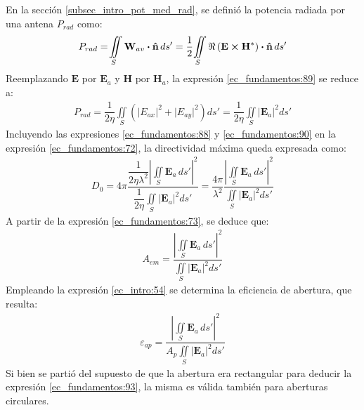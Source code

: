 En la sección \ref{subsec_intro_pot_med_rad}, se definió la potencia radiada por una antena $P_{rad}$ como:
\begin{align}
P_{rad} = \!\iint\limits_S\mathbf{W}_{av}\boldsymbol{\cdot}\bm{\mathbf{\hat{n}}}\,ds' = \dfrac{1}{2}\!\iint\limits_S\Re\left(\mathbf{E}\boldsymbol{\times}\mathbf{H}^*\right)\boldsymbol{\cdot}\bm{\mathbf{\hat{n}}}\,ds'
\label{ec_fundamentos:89}
\end{align}
Reemplazando $\mathbf{E}$ por $\mathbf{E}_a$ y $\mathbf{H}$ por $\mathbf{H}_a$, la expresión \eqref{ec_fundamentos:89} se reduce a:
\begin{align}
P_{rad} = \dfrac{1}{2\eta}\!\iint\limits_S\left(\lvert E_{ax}\rvert^2 + \lvert E_{ay}\rvert^2\right)ds' = \dfrac{1}{2\eta}\!\iint\limits_S\lvert \mathbf{E}_a\rvert^2 ds'
\label{ec_fundamentos:90}
\end{align}
Incluyendo las expresiones \eqref{ec_fundamentos:88} y \eqref{ec_fundamentos:90} en la expresión \eqref{ec_fundamentos:72}, la directividad máxima queda expresada como:
\begin{align}
D_0  = 4\pi\dfrac{\dfrac{1}{2\eta\lambda^2}\left|\displaystyle\iint\limits_S\mathbf{E}_a\, ds'\right|^2}{\dfrac{1}{2\eta}\!\displaystyle\iint\limits_S\lvert \mathbf{E}_a\rvert^2 ds'}  = \dfrac{4\pi}{\lambda^2}\dfrac{\left|\displaystyle\iint\limits_S\mathbf{E}_a\, ds'\right|^2}{\displaystyle\iint\limits_S\lvert \mathbf{E}_a\rvert^2 ds'}
\label{ec_fundamentos:91}
\end{align}
A partir de  la expresión \eqref{ec_fundamentos:73}, se deduce que:
\begin{align}
A_{em}  = \dfrac{\left|\displaystyle\iint\limits_S\mathbf{E}_a\, ds'\right|^2}{\displaystyle\iint\limits_S\lvert \mathbf{E}_a\rvert^2 ds'}
\label{ec_fundamentos:92}
\end{align}
Empleando la expresión \eqref{ec_intro:54} se determina la eficiencia de abertura, que resulta:
\begin{align}
\varepsilon_{ap}  = \dfrac{\left|\displaystyle\iint\limits_S\mathbf{E}_a\, ds'\right|^2}{A_p\!\displaystyle\iint\limits_S\lvert\mathbf{E}_a\rvert^2 ds'}
\label{ec_fundamentos:93}
\end{align}
Si bien se partió del supuesto de que la abertura era rectangular para deducir la expresión \eqref{ec_fundamentos:93}, la misma es válida también para aberturas circulares.

